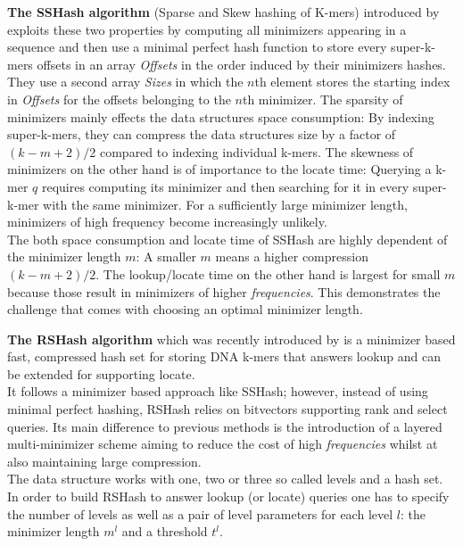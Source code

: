 \documentclass[a4paper,titlepage,onecolumn,oneside,12pt,nenglish,titlepage=firstiscover]{scrbook}
\theoremstyle{plain} %
\theoremstyle{definition} %
\theoremstyle{remark} %
\theoremstyle{plain}
\newcommand{\minimizerLength}{m}
\newcommand{\threshold}{t}
\newcommand{\level}{l}
\begin{document}
\textbf{The SSHash algorithm} (Sparse and Skew hashing of K-mers) introduced by  exploits these two properties by computing all minimizers appearing in a sequence and then use a minimal perfect hash function to store every super-k-mers offsets in an array \textit{Offsets} in the order induced by their minimizers hashes. They use a second array \textit{Sizes} in which the $n$th element stores the starting index in \textit{Offsets} for the offsets belonging to the $n$th minimizer. The sparsity of minimizers mainly effects the data structures space consumption: By indexing super-k-mers, they can compress the data structures size by a factor of $(k-m+2)/2$ compared to indexing individual k-mers. The skewness of minimizers on the other hand is of importance to the locate time: Querying a k-mer $q$ requires computing its minimizer and then searching for it in every super-k-mer with the same minimizer. For a sufficiently large minimizer length, minimizers of high frequency become increasingly unlikely.\\
The both space consumption and locate time of SSHash are highly dependent of the minimizer length $m$: A smaller $m$ means a higher compression $(k-m+2)/2$. The lookup/locate time on the other hand is largest for small $m$ because those result in minimizers of higher \textit{frequencies}. This demonstrates the challenge that comes with choosing an optimal minimizer length.

\newcommand{\infrequent}{\textit{infrequent} }
\newcommand{\frequent}{\textit{frequent} }
\newcommand{\hashfunction}[1]{h_{#1}}
\textbf{The RSHash algorithm} which was recently introduced by \citet{schulte-mattler_rshash_2026} is a minimizer based fast, compressed hash set for storing DNA k-mers that answers lookup and can be extended for supporting locate.\\
It follows a minimizer based approach like SSHash; however, instead of using minimal perfect hashing, RSHash relies on bitvectors supporting rank and select queries. Its main difference to previous methods is the introduction of a layered multi-minimizer scheme aiming to reduce the cost of high \textit{frequencies} whilst at also maintaining large compression.\\
The data structure works with one, two or three so called levels and a hash set. In order to build RSHash to answer lookup (or locate) queries one has to specify the number of levels as well as a pair of level parameters for each level $\level$: the minimizer length $\minimizerLength^\level$ and a threshold $\threshold^\level$.
\end{document}
